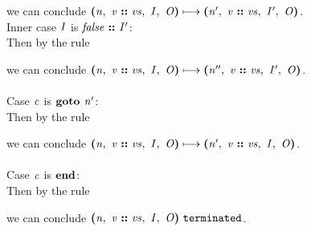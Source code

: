 \documentclass[12pt]{article}
\begin{document}
we can conclude
$\steps{
   \cfg{\nterm{n}}{\cons{\nterm{v}}{\nterm{vs}}}{\nterm{I}}{\nterm{O}}
 }{
   \cfg{\nterm{n'}}{\cons{\nterm{v}}{\nterm{vs}}}{\nterm{I'}}{\nterm{O}}
 }$.\\

Inner case $\nterm{I}$ is $\cons{\nterm{false}}{\nterm{I'}}$:\\

Then by the rule

\begin{mathpar}
\end{mathpar}

we can conclude
$\steps{
   \cfg{\nterm{n}}{\cons{\nterm{v}}{\nterm{vs}}}{\nterm{I}}{\nterm{O}}
 }{
   \cfg{\nterm{n''}}{\cons{\nterm{v}}{\nterm{vs}}}{\nterm{I'}}{\nterm{O}}
 }$.\\
\\

Case $\nterm{c}$ is $\goto{\nterm{n'}}$:\\

Then by the rule

\begin{mathpar}
\end{mathpar}

we can conclude
$\steps{
   \cfg{\nterm{n}}{\cons{\nterm{v}}{\nterm{vs}}}{\nterm{I}}{\nterm{O}}
 }{
   \cfg{\nterm{n'}}{\cons{\nterm{v}}{\nterm{vs}}}{\nterm{I}}{\nterm{O}}
 }$.\\
\\

Case $\nterm{c}$ is $\progend$:\\

Then by the rule

\begin{mathpar}
\end{mathpar}

we can conclude
$\terminated{\cfg{\nterm{n}}{\cons{\nterm{v}}{\nterm{vs}}}{\nterm{I}}{\nterm{O}}}$.
\end{document}

